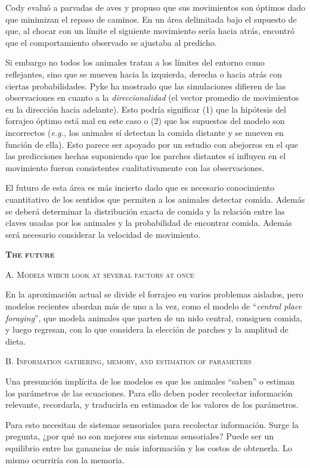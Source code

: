 \documentclass[a4paper,12pt]{article}
\begin{document}
Cody evaluó a parvadas de aves y propuso que sus movimientos son óptimos dado que minimizan el repaso de caminos. En un área delimitada bajo el supuesto de que, al chocar con un límite el siguiente movimiento sería hacia atrás, encontró que el comportamiento observado se ajustaba al predicho.

Si embargo no todos los animales tratan a los límites del entorno como reflejantes, sino que se mueven hacia la izquierda, derecha o hacia atrás con ciertas probabilidades. Pyke ha mostrado que las simulaciones difieren de las observaciones en cuanto a la {\itshape direccionalidad} (el vector promedio de movimientos en la dirección hacia adelante). Esto podría significar (1) que la hipótesis del forrajeo óptimo está mal en este caso o (2) que los supuestos del modelo son incorrectos ({\itshape e.g.,} los animales sí detectan la comida distante y se mueven en función de ella). Esto parece ser apoyado por un estudio con abejorros en el que las predicciones hechas suponiendo que los parches distantes sí influyen en el movimiento fueron consistentes cualitativamente con las observaciones.

El futuro de esta área es más incierto dado que es necesario conocimiento cuantitativo de los sentidos que permiten a los animales detectar comida. Además se deberá determinar la distribución exacta de comida y la relación entre las claves usadas por los animales y la probabilidad de encontrar comida. Además será necesario considerar la velocidad de movimiento.

{\scshape\bfseries The future}

{\scshape A. Models which look at several factors at once}

En la aproximación actual se divide el forrajeo en varios problemas aislados, pero modelos recientes abordan más de uno a la vez, como el modelo de ``{\itshape central place foraging}'', que modela animales que parten de un nido central, consiguen comida, y luego regresan, con lo que considera la elección de parches y la amplitud de dieta.

{\scshape B. Information gathering, memory, and estimation of parameters}

Una presunción implícita de los modelos es que los animales ``saben'' o estiman los parámetros de las ecuaciones. Para ello deben poder recolectar información relevante, recordarla, y traducirla en estimados de los valores de los parámetros.

Para esto necesitan de sistemas sensoriales para recolectar información. Surge la pregunta, ¿por qué no son mejores sus sistemas sensoriales? Puede ser un equilibrio entre las ganancias de más información y los costos de obtenerla. Lo mismo ocurriría con la memoria.
\end{document}
